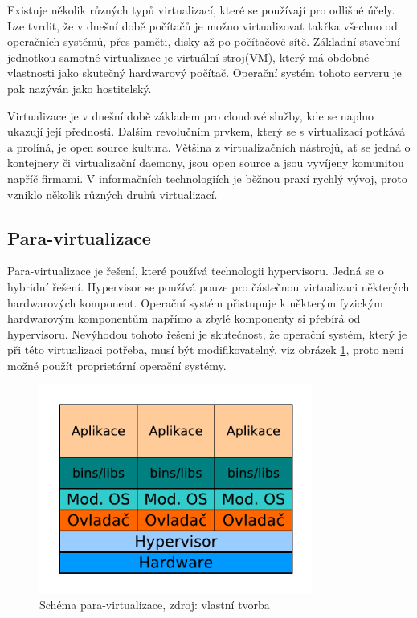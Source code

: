 Existuje několik různých typů virtualizací, které se používají pro odlišné účely. Lze tvrdit, že v dnešní době počítačů je možno virtualizovat takřka všechno od operačních systémů, přes paměti, disky až po počítačové sítě. Základní stavební jednotkou samotné virtualizace je virtuální stroj(VM), který má obdobné vlastnosti jako skutečný hardwarový počítač. Operační systém tohoto serveru je pak nazýván jako hostitelský. 
 
Virtualizace je v dnešní době základem pro cloudové služby, kde se naplno ukazují její přednosti. Dalším revolučním prvkem, který se s virtualizací potkává a prolíná, je open source kultura. Většina z virtualizačních nástrojů, ať se jedná o kontejnery či virtualizační daemony, jsou open source a jsou vyvíjeny komunitou napříč firmami. V informačních technologiích je běžnou praxí rychlý vývoj, proto vzniklo  několik různých druhů virtualizací.

\subsection{Para-virtualizace}
Para-virtualizace je řešení, které používá technologii hypervisoru. Jedná se o  hybridní řešení. Hypervisor se používá pouze pro částečnou virtualizaci některých hardwarových komponent. Operační systém přistupuje k některým fyzickým hardwarovým komponentům napřímo a zbylé komponenty si přebírá od hypervisoru. Nevýhodou tohoto řešení je skutečnost, že operační systém, který je při této virtualizaci potřeba, musí být modifikovatelný, viz obrázek \ref{fig:paravirt}, proto není možné použít proprietární operační systémy.

\begin{figure}[H]
\begin{centering}
\includegraphics[width=0.8\textwidth]{img/paravirt.pdf}
\par\end{centering}
\caption{Schéma para-virtualizace, zdroj: vlastní tvorba} \label{fig:paravirt}
\end{figure}

